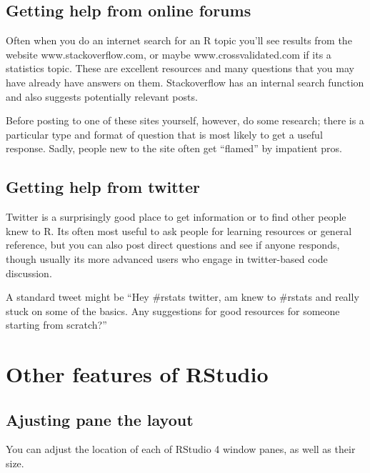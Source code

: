 \documentclass[
]{book}
\begin{document}
\hypertarget{getting-help-from-online-forums}{%
\subsection{Getting help from online forums}\label{getting-help-from-online-forums}}

Often when you do an internet search for an R topic you'll see results from the website www.stackoverflow.com, or maybe www.crossvalidated.com if its a statistics topic. These are excellent resources and many questions that you may have already have answers on them. Stackoverflow has an internal search function and also suggests potentially relevant posts.

Before posting to one of these sites yourself, however, do some research; there is a particular type and format of question that is most likely to get a useful response. Sadly, people new to the site often get ``flamed'' by impatient pros.

\hypertarget{getting-help-from-twitter}{%
\subsection{Getting help from twitter}\label{getting-help-from-twitter}}

Twitter is a surprisingly good place to get information or to find other people knew to R. Its often most useful to ask people for learning resources or general reference, but you can also post direct questions and see if anyone responds, though usually its more advanced users who engage in twitter-based code discussion.

A standard tweet might be
``Hey \#rstats twitter, am knew to \#rstats and really stuck on some of the basics. Any suggestions for good resources for someone starting from scratch?''

\hypertarget{other-features-of-rstudio}{%
\section{Other features of RStudio}\label{other-features-of-rstudio}}

\hypertarget{ajusting-pane-the-layout}{%
\subsection{Ajusting pane the layout}\label{ajusting-pane-the-layout}}

You can adjust the location of each of RStudio 4 window panes, as well as their size.
\end{document}
